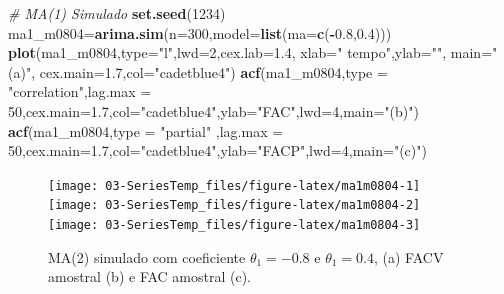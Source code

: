 \documentclass[
]{book}
\newenvironment{Shaded}{\begin{snugshade}}{\end{snugshade}}
\newcommand{\CommentTok}[1]{\textcolor[rgb]{0.56,0.35,0.01}{\textit{#1}}}
\newcommand{\DataTypeTok}[1]{\textcolor[rgb]{0.13,0.29,0.53}{#1}}
\newcommand{\DecValTok}[1]{\textcolor[rgb]{0.00,0.00,0.81}{#1}}
\newcommand{\FloatTok}[1]{\textcolor[rgb]{0.00,0.00,0.81}{#1}}
\newcommand{\KeywordTok}[1]{\textcolor[rgb]{0.13,0.29,0.53}{\textbf{#1}}}
\newcommand{\NormalTok}[1]{#1}
\newcommand{\OperatorTok}[1]{\textcolor[rgb]{0.81,0.36,0.00}{\textbf{#1}}}
\newcommand{\StringTok}[1]{\textcolor[rgb]{0.31,0.60,0.02}{#1}}
\theoremstyle{definition}
\theoremstyle{definition}
\theoremstyle{definition}
\theoremstyle{remark}
\begin{document}
\begin{Shaded}
\begin{Highlighting}[]
\CommentTok{# MA(1) Simulado}
\KeywordTok{set.seed}\NormalTok{(}\DecValTok{1234}\NormalTok{)}
\NormalTok{ma1_m0804=}\KeywordTok{arima.sim}\NormalTok{(}\DataTypeTok{n=}\DecValTok{300}\NormalTok{,}\DataTypeTok{model=}\KeywordTok{list}\NormalTok{(}\DataTypeTok{ma=}\KeywordTok{c}\NormalTok{(}\OperatorTok{-}\FloatTok{0.8}\NormalTok{,}\FloatTok{0.4}\NormalTok{)))}
\KeywordTok{plot}\NormalTok{(ma1_m0804,}\DataTypeTok{type=}\StringTok{"l"}\NormalTok{,}\DataTypeTok{lwd=}\DecValTok{2}\NormalTok{,}\DataTypeTok{cex.lab=}\FloatTok{1.4}\NormalTok{, }\DataTypeTok{xlab=}\StringTok{" tempo"}\NormalTok{,}\DataTypeTok{ylab=}\StringTok{""}\NormalTok{, }\DataTypeTok{main=}\StringTok{"(a)"}\NormalTok{, }\DataTypeTok{cex.main=}\FloatTok{1.7}\NormalTok{,}\DataTypeTok{col=}\StringTok{"cadetblue4"}\NormalTok{)}
\KeywordTok{acf}\NormalTok{(ma1_m0804,}\DataTypeTok{type =} \StringTok{"correlation"}\NormalTok{,}\DataTypeTok{lag.max =} \DecValTok{50}\NormalTok{,}\DataTypeTok{cex.main=}\FloatTok{1.7}\NormalTok{,}\DataTypeTok{col=}\StringTok{"cadetblue4"}\NormalTok{,}\DataTypeTok{ylab=}\StringTok{"FAC"}\NormalTok{,}\DataTypeTok{lwd=}\DecValTok{4}\NormalTok{,}\DataTypeTok{main=}\StringTok{"(b)"}\NormalTok{)}
\KeywordTok{acf}\NormalTok{(ma1_m0804,}\DataTypeTok{type =} \StringTok{"partial"}\NormalTok{ ,}\DataTypeTok{lag.max =} \DecValTok{50}\NormalTok{,}\DataTypeTok{cex.main=}\FloatTok{1.7}\NormalTok{,}\DataTypeTok{col=}\StringTok{"cadetblue4"}\NormalTok{,}\DataTypeTok{ylab=}\StringTok{"FACP"}\NormalTok{,}\DataTypeTok{lwd=}\DecValTok{4}\NormalTok{,}\DataTypeTok{main=}\StringTok{"(c)"}\NormalTok{)}
\end{Highlighting}
\end{Shaded}

\begin{figure}
\texttt{[image: 03-SeriesTemp\_files/figure-latex/ma1m0804-1]} \texttt{[image: 03-SeriesTemp\_files/figure-latex/ma1m0804-2]} \texttt{[image: 03-SeriesTemp\_files/figure-latex/ma1m0804-3]} \caption{MA(2) simulado com coeficiente $\theta_1=-0.8$ e $\theta_1=0.4$, (a) FACV amostral (b) e FAC amostral (c).}\label{fig:ma1m0804}
\end{figure}
\end{document}
